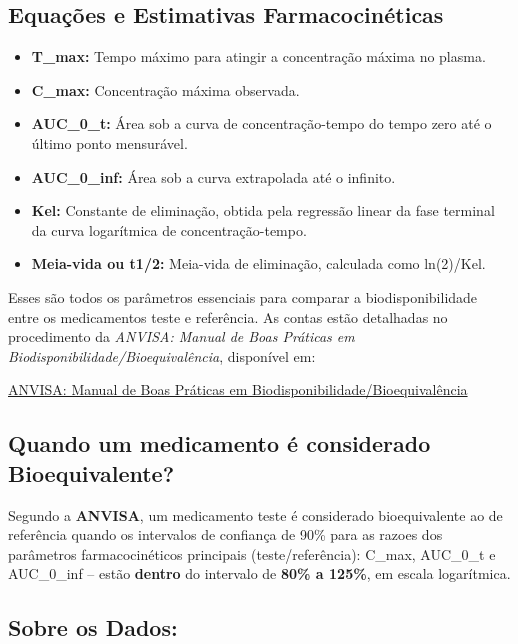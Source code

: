 \documentclass[
]{article}
\providecommand{\tightlist}{%
  \setlength{\itemsep}{0pt}\setlength{\parskip}{0pt}}
\begin{document}
\hypertarget{equauxe7uxf5es-e-estimativas-farmacocinuxe9ticas}{%
\subsection{Equações e Estimativas
Farmacocinéticas}\label{equauxe7uxf5es-e-estimativas-farmacocinuxe9ticas}}

\begin{itemize}
\tightlist
\item
  \textbf{T\_max:} Tempo máximo para atingir a concentração máxima no
  plasma.
\item
  \textbf{C\_max:} Concentração máxima observada.
\item
  \textbf{AUC\_0\_t:} Área sob a curva de concentração-tempo do tempo
  zero até o último ponto mensurável.
\item
  \textbf{AUC\_0\_inf:} Área sob a curva extrapolada até o infinito.
\item
  \textbf{Kel:} Constante de eliminação, obtida pela regressão linear da
  fase terminal da curva logarítmica de concentração-tempo.
\item
  \textbf{Meia-vida ou t1/2:} Meia-vida de eliminação, calculada como
  ln(2)/Kel.
\end{itemize}

Esses são todos os parâmetros essenciais para comparar a
biodisponibilidade entre os medicamentos teste e referência. As contas
estão detalhadas no procedimento da \emph{ANVISA: Manual de Boas
Práticas em Biodisponibilidade/Bioequivalência}, disponível em:

\href{https://docs.bvsalud.org/upload/M/2002/anvisa_Manual_etapa.pdf}{ANVISA:
Manual de Boas Práticas em Biodisponibilidade/Bioequivalência}

\hypertarget{quando-um-medicamento-uxe9-considerado-bioequivalente}{%
\subsection{Quando um medicamento é considerado
Bioequivalente?}\label{quando-um-medicamento-uxe9-considerado-bioequivalente}}

Segundo a \textbf{ANVISA}, um medicamento teste é considerado
bioequivalente ao de referência quando os intervalos de confiança de
90\% para as razoes dos parâmetros farmacocinéticos principais
(teste/referência): C\_max, AUC\_0\_t e AUC\_0\_inf -- estão
\textbf{dentro} do intervalo de \textbf{80\% a 125\%}, em escala
logarítmica.

\hypertarget{sobre-os-dados}{%
\subsection{Sobre os Dados:}\label{sobre-os-dados}}
\end{document}
